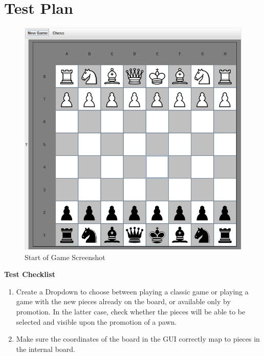 \documentclass{article}
\begin{document}
\section{Test Plan}
\begin{figure}[H]
  \centering
    \includegraphics[scale=0.4]{ChessGUI.png}
  \caption{Start of Game Screenshot}
\end{figure}

\centerline{\textbf{Test Checklist}}
\begin{enumerate}
\item
  Create a Dropdown to choose between playing a classic game or playing a
  game with the new pieces already on the board, or available only
  by promotion. In the latter case, check whether the pieces will be able
  to be selected and visible upon the promotion of a pawn.
\item
  Make sure the coordinates of the board in the GUI
  correctly map to pieces in the internal board.
\end{enumerate}
\end{document}
